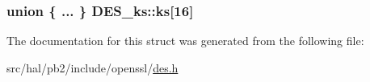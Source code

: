 \subsubsection[{\texorpdfstring{ks}{ks}}]{\setlength{\rightskip}{0pt plus 5cm}union \{ ... \}   D\+E\+S\+\_\+ks\+::ks\mbox{[}16\mbox{]}}\hypertarget{struct_d_e_s__ks_a73d257d1231d7c06d70d657c63819edd}{}\label{struct_d_e_s__ks_a73d257d1231d7c06d70d657c63819edd}


The documentation for this struct was generated from the following file\+:\begin{DoxyCompactItemize}
\item 
src/hal/pb2/include/openssl/\hyperlink{des_8h}{des.\+h}\end{DoxyCompactItemize}
